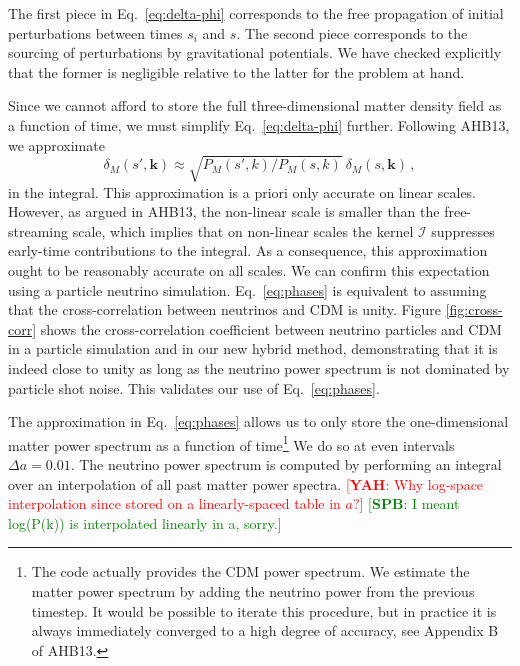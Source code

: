 \documentclass[useAMS, usenatbib]{mnras}
\newcommand{\bs}{\mathbf}
\newcommand{\spb}[1]{{\textcolor{green}{[{\bf SPB}: #1]}}}
\newcommand{\yah}[1]{{\textcolor{red}{[{\bf YAH}: #1]}}}
\begin{document}
The first piece in Eq.~\eqref{eq:delta-phi} corresponds to the free propagation of initial perturbations between times $s_i$ and $s$. The second piece corresponds to the sourcing of perturbations by gravitational potentials. We have checked explicitly that the former is negligible relative to the latter for the problem at hand.


Since we cannot afford to store the full three-dimensional matter density field as a function of time, we must simplify Eq.~\eqref{eq:delta-phi} further. Following AHB13, we approximate
\begin{equation}
 \delta_M(s', \bs{k}) \approx \sqrt{P_M(s', k)/P_M(s, k)}~ \delta_M(s, \bs{k})\,,
 \label{eq:phases}
\end{equation}
in the integral. This approximation is a priori only accurate on linear scales. However, as argued in AHB13, the non-linear scale is smaller than the free-streaming scale, which implies that on non-linear scales the kernel $\mathcal{I}$ suppresses early-time contributions to the integral. As a consequence, this approximation ought to be reasonably accurate on all scales. We can confirm this expectation using a particle neutrino simulation. Eq.~\ref{eq:phases} is equivalent to assuming that the cross-correlation between neutrinos and CDM is unity. Figure \ref{fig:cross-corr} shows the cross-correlation coefficient between neutrino particles and CDM in a particle simulation and in our new hybrid method, demonstrating that it is indeed close to unity as long as the neutrino power spectrum is not dominated by particle shot noise. This validates our use of Eq.~\ref{eq:phases}.

The approximation in Eq.~\ref{eq:phases} allows us to only store the one-dimensional matter power spectrum as a function of time\footnote{The code actually provides the CDM power spectrum. We estimate the matter power spectrum by adding the neutrino power from the previous timestep. It would be possible to iterate this procedure, but in practice it is always immediately converged to a high degree of accuracy, see Appendix B of AHB13.} We do so at even intervals $\Delta a = 0.01$. The neutrino power spectrum is computed by performing an integral over an interpolation of all past matter power spectra. \yah{Why log-space interpolation since stored on a linearly-spaced table in $a$?} \spb{I meant log(P(k)) is interpolated linearly in a, sorry.}
\end{document}
